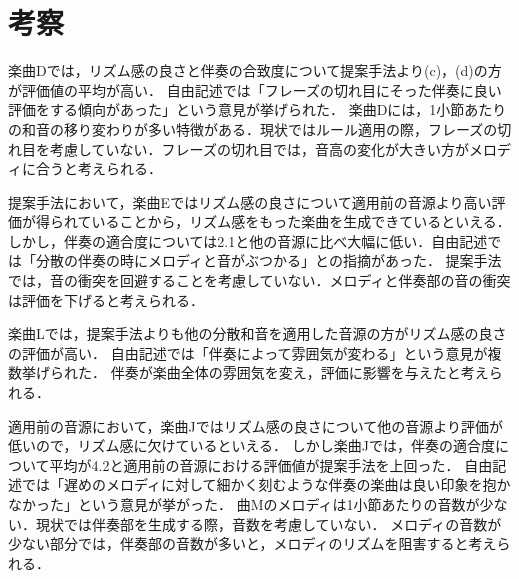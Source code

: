 \chapter{考察}
楽曲Dでは，リズム感の良さと伴奏の合致度について提案手法より(c)，(d)の方が評価値の平均が高い．
自由記述では「フレーズの切れ目にそった伴奏に良い評価をする傾向があった」という意見が挙げられた．
楽曲Dには，1小節あたりの和音の移り変わりが多い特徴がある．現状ではルール適用の際，フレーズの切れ目を考慮していない．フレーズの切れ目では，音高の変化が大きい方がメロディに合うと考えられる．


提案手法において，楽曲Eではリズム感の良さについて適用前の音源より高い評価が得られていることから，リズム感をもった楽曲を生成できているといえる．
しかし，伴奏の適合度については2.1と他の音源に比べ大幅に低い．自由記述では「分散の伴奏の時にメロディと音がぶつかる」との指摘があった．
提案手法では，音の衝突を回避することを考慮していない．メロディと伴奏部の音の衝突は評価を下げると考えられる．

楽曲Lでは，提案手法よりも他の分散和音を適用した音源の方がリズム感の良さの評価が高い．
自由記述では「伴奏によって雰囲気が変わる」という意見が複数挙げられた．
伴奏が楽曲全体の雰囲気を変え，評価に影響を与えたと考えられる．

適用前の音源において，楽曲Jではリズム感の良さについて他の音源より評価が低いので，リズム感に欠けているといえる．
しかし楽曲Jでは，伴奏の適合度について平均が4.2と適用前の音源における評価値が提案手法を上回った．
自由記述では「遅めのメロディに対して細かく刻むような伴奏の楽曲は良い印象を抱かなかった」という意見が挙がった．
曲Mのメロディは1小節あたりの音数が少ない．現状では伴奏部を生成する際，音数を考慮していない．
メロディの音数が少ない部分では，伴奏部の音数が多いと，メロディのリズムを阻害すると考えられる．
